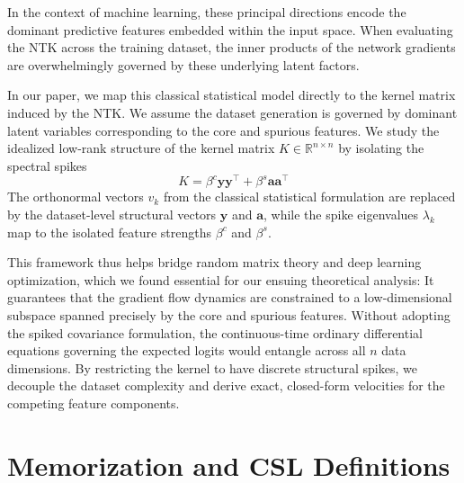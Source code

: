 \documentclass[letter,11pt]{article}
\begin{document}
In the context of machine learning, these principal directions encode the dominant predictive features embedded within the input space. When evaluating the NTK across the training dataset, the inner products of the network gradients are overwhelmingly governed by these underlying latent factors.

In our paper, we map this classical statistical model directly to the kernel matrix induced by the NTK. We assume the dataset generation is  governed by dominant latent variables corresponding to the core and spurious features. We study the idealized low-rank structure of the kernel matrix $K \in \mathbb{R}^{n \times n}$ by isolating the spectral spikes
\begin{equation}
K = \beta^c \mathbf{y} \mathbf{y}^\top + \beta^s \mathbf{a} \mathbf{a}^\top
\end{equation}
The orthonormal vectors $v_k$ from the classical statistical formulation are replaced by the dataset-level structural vectors $\mathbf{y}$ and $\mathbf{a}$, while the spike eigenvalues $\lambda_k$ map to the isolated feature strengths $\beta^c$ and $\beta^s$.

This framework thus helps bridge random matrix theory and deep learning optimization, which we found essential for our ensuing theoretical analysis: It guarantees that the gradient flow dynamics are constrained to a low-dimensional subspace spanned precisely by the core and spurious features. Without adopting the spiked covariance formulation, the continuous-time ordinary differential equations governing the expected logits would entangle across all $n$ data dimensions. By restricting the kernel to have discrete structural spikes, we decouple the dataset complexity and derive exact, closed-form velocities for the competing feature components.

\section{Memorization and CSL Definitions}\label{sec:app_memo_csl}
\end{document}
